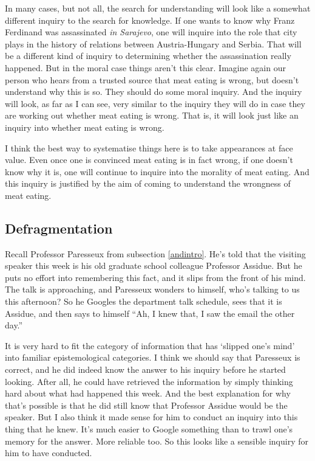 \documentclass[
  11pt,
]{book}
\begin{document}
In many cases, but not all, the search for understanding will look like a somewhat different inquiry to the search for knowledge. If one wants to know why Franz Ferdinand was assassinated \emph{in Sarajevo}, one will inquire into the role that city plays in the history of relations between Austria-Hungary and Serbia. That will be a different kind of inquiry to determining whether the assassination really happened. But in the moral case things aren't this clear. Imagine again our person who hears from a trusted source that meat eating is wrong, but doesn't understand why this is so. They should do some moral inquiry. And the inquiry will look, as far as I can see, very similar to the inquiry they will do in case they are working out whether meat eating is wrong. That is, it will look just like an inquiry into whether meat eating is wrong.

I think the best way to systematise things here is to take appearances at face value. Even once one is convinced meat eating is in fact wrong, if one doesn't know why it is, one will continue to inquire into the morality of meat eating. And this inquiry is justified by the aim of coming to understand the wrongness of meat eating.

\hypertarget{defraginquiry}{%
\subsection{Defragmentation}\label{defraginquiry}}

Recall Professor Paresseux from subsection \ref{andintro}. He's told that the visiting speaker this week is his old graduate school colleague Professor Assidue. But he puts no effort into remembering this fact, and it slips from the front of his mind. The talk is approaching, and Paresseux wonders to himself, who's talking to us this afternoon? So he Googles the department talk schedule, sees that it is Assidue, and then says to himself ``Ah, I knew that, I saw the email the other day.''

It is very hard to fit the category of information that has `slipped one's mind' into familiar epistemological categories. I think we should say that Paresseux is correct, and he did indeed know the answer to his inquiry before he started looking. After all, he could have retrieved the information by simply thinking hard about what had happened this week. And the best explanation for why that's possible is that he did still know that Professor Assidue would be the speaker. But I also think it made sense for him to conduct an inquiry into this thing that he knew. It's much easier to Google something than to trawl one's memory for the answer. More reliable too. So this looks like a sensible inquiry for him to have conducted.
\end{document}
